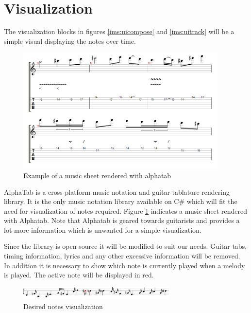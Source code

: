  
\section{Visualization}
The visualization blocks in figures \ref{ims:uicompose} and \ref{ims:uitrack} will be a simple visual displaying the notes over time. 


\begin{figure}
\centerline{\includegraphics[width=400px]{../images/alphatab_example.png}}
\caption{Example of a music sheet rendered with alphatab}
\label{ims:alphatab}
\end{figure}

AlphaTab is a cross platform music notation and guitar tablature rendering library. It is the only music notation library available on C\# which will fit the need for visualization of notes required.
Figure \ref{ims:alphatab} indicates a music sheet rendered with Alphatab. Note that Alphatab is geared towards guitarists and provides a lot more information which is unwanted for a simple visualization. 

Since the library is open source it will be modified to suit our needs. Guitar tabs, timing information, lyrics and any other excessive information will be removed. In addition it is necessary to show which note is currently played when a melody is played. The active note will be displayed in red.

\begin{figure}
\centerline{\includegraphics[width=300px]{../images/music_sheet_visualization.png}}
\caption{Desired notes visualization}
\label{ims:uiharrynotesvisualization}
\end{figure}

